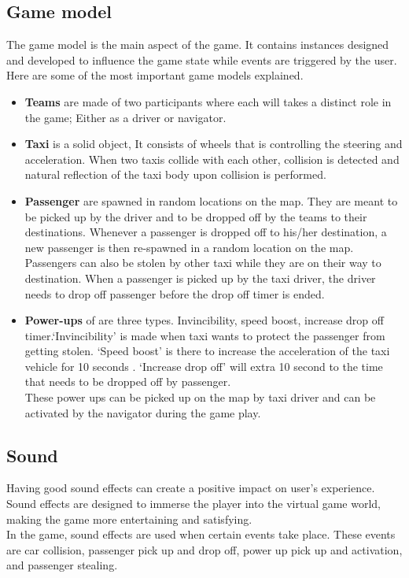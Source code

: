 
\subsection*{Game model}
	The game model is the main aspect of the game. It contains instances designed and developed to influence the game state while events are triggered by the user. Here are some of the most important game models explained.

\begin{itemize}
	
	\item \textbf{Teams }are made of two participants where each will takes a distinct role in the game; Either as a driver or navigator.
	\item \textbf{Taxi} is a solid object, It consists of wheels that is controlling the steering and acceleration. When two taxis collide with each other, collision is detected and natural reflection of the taxi body upon collision is performed.  	
	\item \textbf{Passenger} are spawned in random locations on the map. They are meant to be picked up by the driver and to be dropped off by the teams to their destinations. Whenever a passenger is dropped off to his/her destination, a new passenger is then re-spawned in a random location on the map. Passengers can also be stolen by other taxi while they are on their way to destination. When a passenger is picked up by the taxi driver, the driver needs to drop off passenger before the drop off timer is ended.
			
	\item \textbf{Power-ups } of are three types. Invincibility, speed boost, increase drop off timer.`Invincibility' is made when taxi wants to protect the passenger from getting stolen. `Speed boost' is there to increase the acceleration of the taxi vehicle for 10 seconds . `Increase drop off' will extra 10 second to the time that needs to be dropped off by passenger.\\
	These power ups can be picked up on the map by taxi driver and can be activated by the navigator during the game play.   
\end{itemize}	


\subsection*{Sound}
	Having good sound effects can create a positive impact on user's experience. Sound effects are designed to immerse the player into the virtual game world, making the game more entertaining and satisfying.\\
	In the game, sound effects are used when certain events take place. These events are car collision, passenger pick up and drop off, power up pick up and activation, and passenger stealing.



